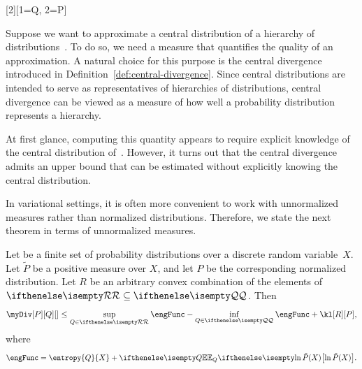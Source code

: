 [2][1=Q, 2=P]{}
\newcommand{\infR}{\inf_{\inSet{R}}}
\newcommand{\supR}{\sup_{\inSet{R}}}

Suppose we want to approximate a central distribution of a hierarchy of distributions~.
To do so, we need a measure that quantifies the quality of an approximation.
A natural choice for this purpose is the central divergence introduced in Definition~\ref{def:central-divergence}.
Since central distributions are intended to serve as representatives of hierarchies of distributions,
central divergence can be viewed as a measure of how well a probability distribution represents a hierarchy.

At first glance, computing this quantity appears to require explicit knowledge of the central distribution of~.
However, it turns out that the central divergence admits an upper bound that can be estimated without explicitly
knowing the central distribution.

In variational settings, it is often more convenient to work with unnormalized measures rather than normalized
distributions.
Therefore, we state the next theorem in terms of unnormalized measures.

\begin{theorem}\label{th:central-approx}
    Let \setQ be a finite set of probability distributions over a discrete random variable~$X$.
    Let $\tilde{P}$ be a positive measure over $X$,
    and let $P$ be the corresponding normalized distribution.
    Let $R$ be an arbitrary convex combination of the elements of $\set{R} \subseteq \setQ$.
    Then
    \[
        \myDiv[P][Q][] \leq \supR \engFunc - \inf_{\inSet{Q}} \engFunc + \kl[R][P],
    \]
    where
    \[
        \engFunc = \entropy{Q}{X} + \Ex{Q}{\ln \tilde{P}(X)}.
    \]
\end{theorem}

